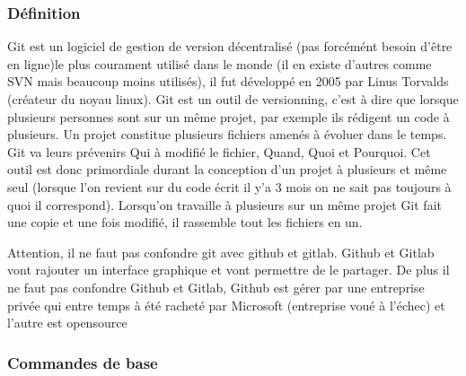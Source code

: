 \subsubsection{Définition}
Git est un logiciel de gestion de version décentralisé (pas forcémént besoin d'être en ligne)le plus courament utilisé dans le monde (il en existe d'autres comme SVN mais beaucoup moins utilisés), il fut développé en 2005 par Linus Torvalds (créateur du noyau linux).
Git est un outil de versionning, c'est à dire que lorsque plusieurs personnes sont sur un même projet, par exemple ils rédigent un code à plusieurs. Un projet constitue plusieurs fichiers amenés à évoluer dans le temps. Git va leurs prévenirs Qui à modifié le fichier, Quand, Quoi et Pourquoi. Cet outil est donc primordiale durant la conception d'un projet à plusieurs et même seul (lorsque l'on revient sur du code écrit il y'a 3 mois on ne sait pas toujours à quoi il correspond). Lorsqu'on travaille à plusieurs sur un même projet Git fait une copie et une fois modifié, il rassemble tout les fichiers en un.

Attention, il ne faut pas confondre git avec github et gitlab. Github et Gitlab vont rajouter un interface graphique et vont permettre de le partager. De plus il ne faut pas confondre Github et Gitlab, Github est gérer par une entreprise privée qui entre temps à été racheté par Microsoft (entreprise voué à l'échec) et l'autre est opensource 

\subsubsection{Commandes de base}
